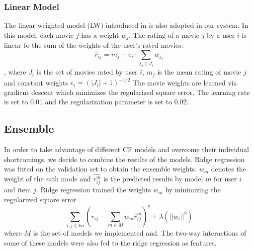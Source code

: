 \documentclass[10pt,conference,compsocconf]{IEEEtran}
\begin{document}
\subsubsection{Linear Model}
The linear weighted model (LW) introduced in \cite{Paterek2007Improving} is also adopted in our system. In this model, each movie $j$ has a weight $w_j$. The rating of a movie $j$ by a user $i$ is linear to the sum of the weights of the user's rated movies.
\[{\hat r_{ij}} = {m_j} + {e_i} \cdot \sum\limits_{{j_2} \in {J_i}} {{w_{{j_2}}}} \]
, where $J_i$ is the set of movies rated by user $i$, $m_j$ is the mean rating of movie $j$ and constant weights ${e_i} = {(\left| {{J_i}} \right| + 1)^{ - 1/2}}$
The movie weights are learned via gradient descent which minimizes the regularized square error. The learning rate is set to 0.01 and the regularization parameter is set to 0.02.

%

\subsection{Ensemble}
In order to take advantage of different CF models and overcome their individual shortcomings, we decide to combine the results of the models. Ridge regression was fitted on the validation set to obtain the ensemble weights. $w_m$ denotes the weight of the $m$th mode and $\hat{r_{ij}^m}$ is the predicted results by model $m$ for user $i$ and item $j$. Ridge regression trained the weights $w_m$ by minimizing the regularized square error
$$  \sum_{i, j\in kn} (r_{ij} - \sum_{m\in M}w_m\hat r_{ij}^m)^2 + \lambda (||w_i||^2)  $$
where $M$ is the set of models we implemented and. The two-way interactions of some of these models were also fed to the ridge regression as features.
\end{document}
